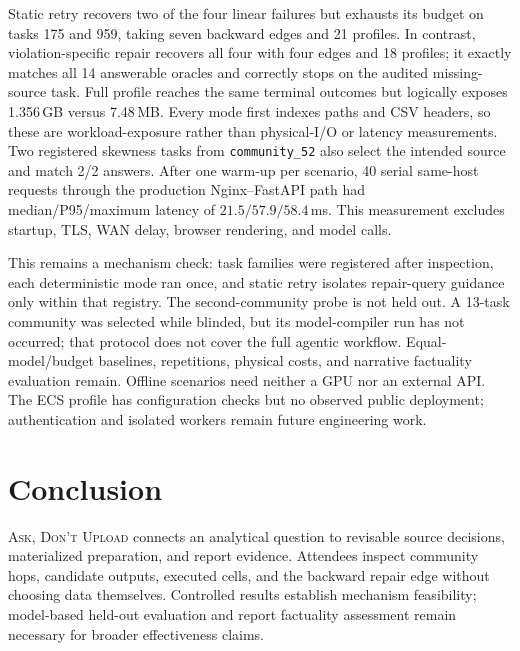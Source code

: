 \documentclass[sigconf, nonacm]{acmart}
\newcommand{\systemname}{\textsc{Ask, Don't Upload}}
\begin{document}
Static retry recovers two of the four linear failures but exhausts its budget on
tasks 175 and 959, taking seven backward edges and 21 profiles.  In contrast,
violation-specific repair recovers all four with four edges and 18 profiles;
it exactly matches all 14
answerable oracles and correctly stops on the audited missing-source task.  Full
profile reaches the same terminal outcomes but logically exposes 1.356\,GB
versus 7.48\,MB.  Every mode first indexes paths and CSV headers, so these are
workload-exposure rather than physical-I/O or latency measurements.  Two
registered skewness tasks from \texttt{community\_52} also select the intended
source and match 2/2 answers.  After one warm-up per
scenario, 40 serial same-host requests through the production Nginx--FastAPI
path had median/P95/maximum latency of $21.5/57.9/58.4$\,ms.  This measurement
excludes startup, TLS, WAN delay, browser rendering, and model calls.

This remains a mechanism check: task families were registered after inspection,
each deterministic mode ran once, and static retry isolates repair-query
guidance only within that registry.  The second-community probe is not held out.
A 13-task community was selected while blinded, but its model-compiler run
has not occurred; that protocol does not cover the full agentic workflow.
Equal-model/budget baselines, repetitions, physical costs,
and narrative factuality evaluation remain.  Offline scenarios need neither
a GPU nor an external API.  The ECS profile has configuration checks but no
observed public deployment; authentication and isolated workers remain future
engineering work.

\balance
\section{Conclusion}

\systemname{} connects an analytical question to revisable source decisions,
materialized preparation, and report evidence.  Attendees inspect community
hops, candidate outputs, executed cells, and the backward repair edge without
choosing data themselves.  Controlled results establish mechanism feasibility;
model-based held-out evaluation and report factuality assessment remain
necessary for broader effectiveness claims.

\begingroup
{}


\endgroup
\end{document}
